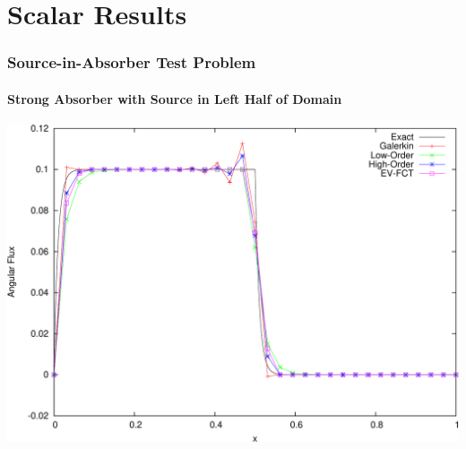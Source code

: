 \section{Scalar Results}
\begin{frame}
\frametitle{Source-in-Absorber Test Problem}
\framesubtitle{Strong Absorber with Source in Left Half of Domain}

\begin{center}
\includegraphics[height=0.8\textheight]{./figures/solutions_source_FE.pdf}
\end{center}

\end{frame}
